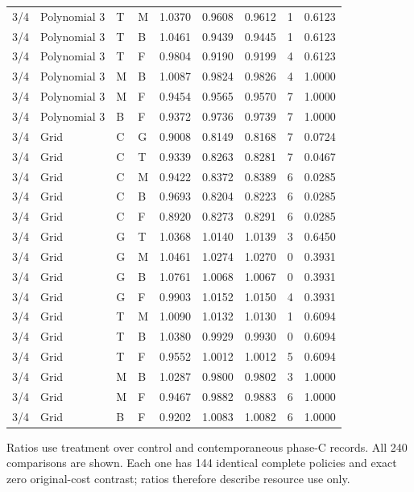 \begin{longtable}{llllrrrrr}
3/4 & Polynomial 3 & T & M & 1.0370 & 0.9608 & 0.9612 & 1 & 0.6123 \\
3/4 & Polynomial 3 & T & B & 1.0461 & 0.9439 & 0.9445 & 1 & 0.6123 \\
3/4 & Polynomial 3 & T & F & 0.9804 & 0.9190 & 0.9199 & 4 & 0.6123 \\
3/4 & Polynomial 3 & M & B & 1.0087 & 0.9824 & 0.9826 & 4 & 1.0000 \\
3/4 & Polynomial 3 & M & F & 0.9454 & 0.9565 & 0.9570 & 7 & 1.0000 \\
3/4 & Polynomial 3 & B & F & 0.9372 & 0.9736 & 0.9739 & 7 & 1.0000 \\
3/4 & Grid & C & G & 0.9008 & 0.8149 & 0.8168 & 7 & 0.0724 \\
3/4 & Grid & C & T & 0.9339 & 0.8263 & 0.8281 & 7 & 0.0467 \\
3/4 & Grid & C & M & 0.9422 & 0.8372 & 0.8389 & 6 & 0.0285 \\
3/4 & Grid & C & B & 0.9693 & 0.8204 & 0.8223 & 6 & 0.0285 \\
3/4 & Grid & C & F & 0.8920 & 0.8273 & 0.8291 & 6 & 0.0285 \\
3/4 & Grid & G & T & 1.0368 & 1.0140 & 1.0139 & 3 & 0.6450 \\
3/4 & Grid & G & M & 1.0461 & 1.0274 & 1.0270 & 0 & 0.3931 \\
3/4 & Grid & G & B & 1.0761 & 1.0068 & 1.0067 & 0 & 0.3931 \\
3/4 & Grid & G & F & 0.9903 & 1.0152 & 1.0150 & 4 & 0.3931 \\
3/4 & Grid & T & M & 1.0090 & 1.0132 & 1.0130 & 1 & 0.6094 \\
3/4 & Grid & T & B & 1.0380 & 0.9929 & 0.9930 & 0 & 0.6094 \\
3/4 & Grid & T & F & 0.9552 & 1.0012 & 1.0012 & 5 & 0.6094 \\
3/4 & Grid & M & B & 1.0287 & 0.9800 & 0.9802 & 3 & 1.0000 \\
3/4 & Grid & M & F & 0.9467 & 0.9882 & 0.9883 & 6 & 1.0000 \\
3/4 & Grid & B & F & 0.9202 & 1.0083 & 1.0082 & 6 & 1.0000 \\
\end{longtable}
\noindent Ratios use treatment over control and contemporaneous phase-C records. All 240 comparisons are shown. Each one has 144 identical complete policies and exact zero original-cost contrast; ratios therefore describe resource use only.
\endgroup
